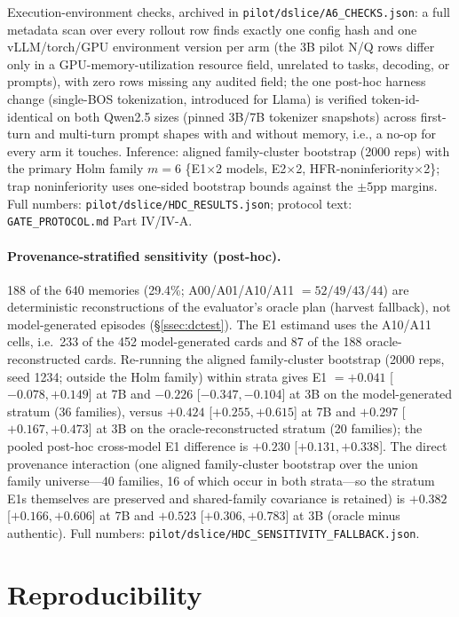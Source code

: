 Execution-environment checks, archived in \texttt{pilot/dslice/A6\_CHECKS.json}: a full metadata scan over every rollout row finds exactly one config hash and one vLLM/torch/GPU environment version per arm (the 3B pilot N/Q rows differ only in a GPU-memory-utilization resource field, unrelated to tasks, decoding, or prompts), with zero rows missing any audited field; the one post-hoc harness change (single-BOS tokenization, introduced for Llama) is verified token-id-identical on both Qwen2.5 sizes (pinned 3B/7B tokenizer snapshots) across first-turn and multi-turn prompt shapes with and without memory, i.e., a no-op for every arm it touches. Inference: aligned family-cluster bootstrap (2000 reps) with the primary Holm family $m=6$ \{E1$\times$2 models, E2$\times$2, HFR-noninferiority$\times$2\}; trap noninferiority uses one-sided bootstrap bounds against the $\pm5$pp margins. Full numbers: \texttt{pilot/dslice/HDC\_RESULTS.json}; protocol text: \texttt{GATE\_PROTOCOL.md} Part IV/IV-A.

\paragraph{Provenance-stratified sensitivity (post-hoc).} 188 of the 640 memories (29.4\%; A00/A01/A10/A11 $=52/49/43/44$) are deterministic reconstructions of the evaluator's oracle plan (harvest fallback), not model-generated episodes (\S\ref{ssec:dctest}). The E1 estimand uses the A10/A11 cells, i.e.\ 233 of the 452 model-generated cards and 87 of the 188 oracle-reconstructed cards. Re-running the aligned family-cluster bootstrap (2000 reps, seed 1234; outside the Holm family) within strata gives E1 $=+0.041$ [$-0.078,+0.149$] at 7B and $-0.226$ [$-0.347,-0.104$] at 3B on the model-generated stratum (36 families), versus $+0.424$ [$+0.255,+0.615$] at 7B and $+0.297$ [$+0.167,+0.473$] at 3B on the oracle-reconstructed stratum (20 families); the pooled post-hoc cross-model E1 difference is $+0.230$ [$+0.131,+0.338$]. The direct provenance interaction (one aligned family-cluster bootstrap over the union family universe---40 families, 16 of which occur in both strata---so the stratum E1s themselves are preserved and shared-family covariance is retained) is $+0.382$ [$+0.166,+0.606$] at 7B and $+0.523$ [$+0.306,+0.783$] at 3B (oracle minus authentic). Full numbers: \texttt{pilot/dslice/HDC\_SENSITIVITY\_FALLBACK.json}.

\section{Reproducibility}
\label{app:repro}


